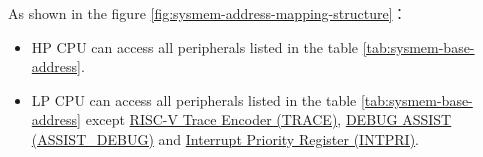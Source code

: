 \documentclass[main\_\_EN.tex]{subfiles}
\begin{document}
\begin{tiplisting}
As shown in the figure \ref{fig:sysmem-address-mapping-structure}：
\begin{itemize}
    \item HP CPU can access all peripherals listed in the table \ref{tab:sysmem-base-address}.
    \item LP CPU can access all peripherals listed in the table \ref{tab:sysmem-base-address} except \hyperref[mod:riscvtracenc]{RISC-V Trace Encoder (TRACE)}, \hyperref[mod:dbgassist]{DEBUG ASSIST  (ASSIST\_DEBUG)} and \hyperref[mod:riscvcpu]{Interrupt Priority Register (INTPRI)}.
\end{itemize}
\end{tiplisting}
\end{document}
